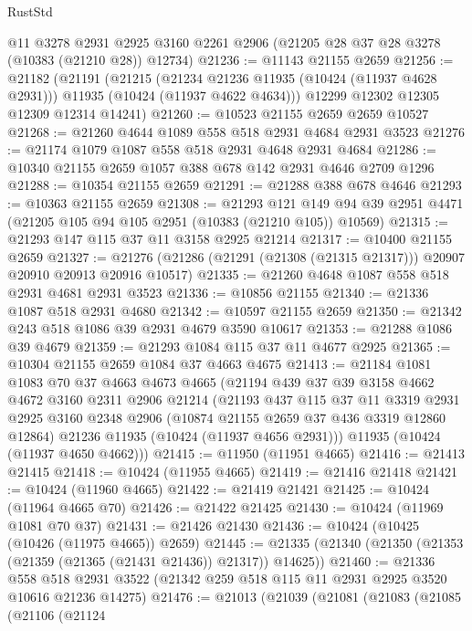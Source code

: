\begin{lexlean}{RustStd}
\begin{coremodule}
    @11
    @3278
    @2931
    @2925
    @3160
    @2261
    @2906
    (@21205 @28 @37 @28 @3278 (@10383 (@21210 @28)) @12734)
@21236 := @11143 @21155 @2659
@21256 := @21182
    (@21191
      (@21215
        (@21234 @21236 @11935 (@10424 (@11937 @4628 @2931)))
        @11935
        (@10424 (@11937 @4622 @4634)))
      @12299
      @12302
      @12305
      @12309
      @12314
      @14241)
@21260 := @10523 @21155 @2659 @2659 @10527
@21268 := @21260 @4644 @1089 @558 @518 @2931 @4684 @2931 @3523
@21276 := @21174 @1079 @1087 @558 @518 @2931 @4648 @2931 @4684
@21286 := @10340 @21155 @2659 @1057 @388 @678 @142 @2931 @4646 @2709 @1296
@21288 := @10354 @21155 @2659
@21291 := @21288 @388 @678 @4646
@21293 := @10363 @21155 @2659
@21308 := @21293
    @121
    @149
    @94
    @39
    @2951
    @4471
    (@21205 @105 @94 @105 @2951 (@10383 (@21210 @105)) @10569)
@21315 := @21293 @147 @115 @37 @11 @3158 @2925 @21214
@21317 := @10400 @21155 @2659
@21327 := @21276 (@21286 (@21291 (@21308 (@21315 @21317))) @20907 @20910 @20913 @20916 @10517)
@21335 := @21260 @4648 @1087 @558 @518 @2931 @4681 @2931 @3523
@21336 := @10856 @21155
@21340 := @21336 @1087 @518 @2931 @4680
@21342 := @10597 @21155 @2659
@21350 := @21342 @243 @518 @1086 @39 @2931 @4679 @3590 @10617
@21353 := @21288 @1086 @39 @4679
@21359 := @21293 @1084 @115 @37 @11 @4677 @2925
@21365 := @10304 @21155 @2659 @1084 @37 @4663 @4675
@21413 := @21184
    @1081
    @1083
    @70
    @37
    @4663
    @4673
    @4665
    (@21194
      @439
      @37
      @39
      @3158
      @4662
      @4672
      @3160
      @2311
      @2906
      @21214
      (@21193
        @437
        @115
        @37
        @11
        @3319
        @2931
        @2925
        @3160
        @2348
        @2906
        (@10874 @21155 @2659 @37 @436 @3319 @12860 @12864)
        @21236
        @11935
        (@10424 (@11937 @4656 @2931)))
      @11935
      (@10424 (@11937 @4650 @4662)))
@21415 := @11950 (@11951 @4665)
@21416 := @21413 @21415
@21418 := @10424 (@11955 @4665)
@21419 := @21416 @21418
@21421 := @10424 (@11960 @4665)
@21422 := @21419 @21421
@21425 := @10424 (@11964 @4665 @70)
@21426 := @21422 @21425
@21430 := @10424 (@11969 @1081 @70 @37)
@21431 := @21426 @21430
@21436 := @10424 (@10425 (@10426 (@11975 @4665)) @2659)
@21445 := @21335 (@21340 (@21350 (@21353 (@21359 (@21365 (@21431 @21436)) @21317)) @14625))
@21460 := @21336
    @558
    @518
    @2931
    @3522
    (@21342 @259 @518 @115 @11 @2931 @2925 @3520 @10616 @21236 @14275)
@21476 := @21013
    (@21039
      (@21081
        (@21083
          (@21085
            (@21106
              (@21124

\end{coremodule}
\end{lexlean}
